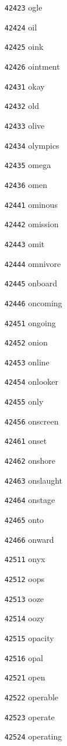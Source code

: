 \documentclass[twoside,11pt]{article}
\begin{document}
\begin{multicols}{5}
\begin{enumerate}
\item[\texttt{42423}] ogle
\item[\texttt{42424}] oil
\item[\texttt{42425}] oink
\item[\texttt{42426}] ointment
\item[\texttt{42431}] okay
\item[\texttt{42432}] old
\item[\texttt{42433}] olive
\item[\texttt{42434}] olympics
\item[\texttt{42435}] omega
\item[\texttt{42436}] omen
\item[\texttt{42441}] ominous
\item[\texttt{42442}] omission
\item[\texttt{42443}] omit
\item[\texttt{42444}] omnivore
\item[\texttt{42445}] onboard
\item[\texttt{42446}] oncoming
\item[\texttt{42451}] ongoing
\item[\texttt{42452}] onion
\item[\texttt{42453}] online
\item[\texttt{42454}] onlooker
\item[\texttt{42455}] only
\item[\texttt{42456}] onscreen
\item[\texttt{42461}] onset
\item[\texttt{42462}] onshore
\item[\texttt{42463}] onslaught
\item[\texttt{42464}] onstage
\item[\texttt{42465}] onto
\item[\texttt{42466}] onward
\item[\texttt{42511}] onyx
\item[\texttt{42512}] oops
\item[\texttt{42513}] ooze
\item[\texttt{42514}] oozy
\item[\texttt{42515}] opacity
\item[\texttt{42516}] opal
\item[\texttt{42521}] open
\item[\texttt{42522}] operable
\item[\texttt{42523}] operate
\item[\texttt{42524}] operating

\end{enumerate}
\end{multicols}
\end{document}
